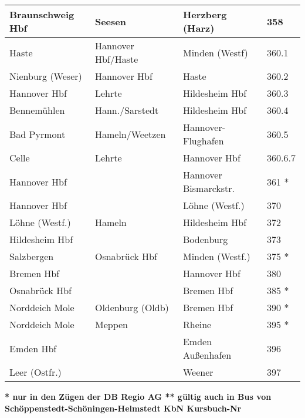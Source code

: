 \begin{table}[htbp]
\begin{center}
\begin{tabular}{|l|l|l|p{1cm}|}
Braunschweig Hbf & Seesen & Herzberg (Harz) & 358 \\ \hline
Haste & Hannover Hbf/Haste & Minden (Westf) & 360.1 \\ \hline
Nienburg (Weser) & Hannover Hbf & Haste & 360.2 \\ \hline
Hannover Hbf & Lehrte & Hildesheim Hbf & 360.3 \\ \hline
Bennemühlen & Hann./Sarstedt & Hildesheim Hbf & 360.4 \\ \hline
Bad Pyrmont & Hameln/Weetzen & Hannover-Flughafen & 360.5 \\ \hline
Celle & Lehrte & Hannover Hbf & 360.6.7 \\ \hline
Hannover Hbf &  & Hannover Bismarckstr. & 361 * \\ \hline
Hannover Hbf &  & Löhne (Westf.) & 370 \\ \hline
Löhne (Westf.) & Hameln & Hildesheim Hbf & 372 \\ \hline
Hildesheim Hbf &  & Bodenburg & 373 \\ \hline
Salzbergen & Osnabrück Hbf & Minden (Westf.) & 375 * \\ \hline
Bremen Hbf &  & Hannover Hbf & 380 \\ \hline
Osnabrück Hbf &  & Bremen Hbf & 385 * \\ \hline
Norddeich Mole & Oldenburg (Oldb) & Bremen Hbf & 390 * \\ \hline
Norddeich Mole & Meppen & Rheine & 395 * \\ \hline
Emden Hbf &  & Emden Außenhafen & 396 \\ \hline
Leer (Ostfr.) &  & Weener & 397 \\ \hline
\end{tabular}
\textbf{* nur in den Zügen der DB Regio AG ** gültig auch in Bus von
  Schöppenstedt-Schöningen-Helmstedt KbN Kursbuch-Nr}
\end{center}
\label{streckenkarte1}
\end{table}
